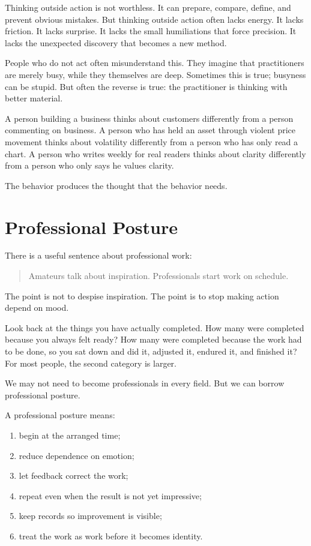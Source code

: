 Thinking outside action is not worthless. It can prepare, compare, define, and prevent obvious mistakes. But thinking outside action often lacks energy. It lacks friction. It lacks surprise. It lacks the small humiliations that force precision. It lacks the unexpected discovery that becomes a new method.

People who do not act often misunderstand this. They imagine that practitioners are merely busy, while they themselves are deep. Sometimes this is true; busyness can be stupid. But often the reverse is true: the practitioner is thinking with better material.

A person building a business thinks about customers differently from a person commenting on business. A person who has held an asset through violent price movement thinks about volatility differently from a person who has only read a chart. A person who writes weekly for real readers thinks about clarity differently from a person who only says he values clarity.

The behavior produces the thought that the behavior needs.

\section*{Professional Posture}

There is a useful sentence about professional work:

\begin{quote}
Amateurs talk about inspiration. Professionals start work on schedule.
\end{quote}

The point is not to despise inspiration. The point is to stop making action depend on mood.

Look back at the things you have actually completed. How many were completed because you always felt ready? How many were completed because the work had to be done, so you sat down and did it, adjusted it, endured it, and finished it? For most people, the second category is larger.

We may not need to become professionals in every field. But we can borrow professional posture.

A professional posture means:

\begin{enumerate}
\item begin at the arranged time;
\item reduce dependence on emotion;
\item let feedback correct the work;
\item repeat even when the result is not yet impressive;
\item keep records so improvement is visible;
\item treat the work as work before it becomes identity.
\end{enumerate}

